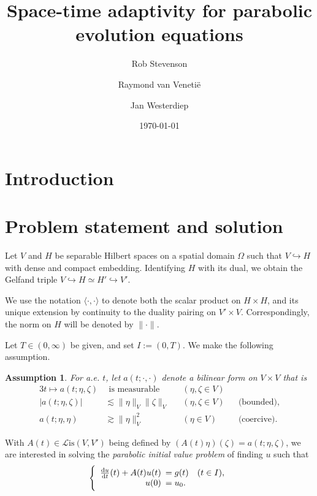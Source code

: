 \documentclass[11pt,a4paper,oneside,english]{amsart}
\title{Space-time adaptivity for parabolic evolution equations}
\author{Rob Stevenson \and Raymond van Veneti\"e \and Jan Westerdiep}
\date{\today}
\numberwithin{equation}{section}
\numberwithin{theorem}{section}
\newtheorem{assum}[theorem]{Assumption}
\theoremstyle{definition}
\newcommand{\la}{\langle}
\newcommand{\ra}{\rangle}
\newcommand{\cL}{\mathcal L}
\newcommand{\Lis}{\cL\mathrm{is}}
\begin{document}
\begin{abstract}
\end{abstract}

\maketitle

\section{Introduction}
\section{Problem statement and solution}
Let $V$ and $H$ be separable Hilbert spaces on a spatial domain $\Omega$ such that
$V \hookrightarrow H$ with dense and compact embedding. Identifying $H$ with its
dual, we obtain the Gelfand triple $V \hookrightarrow H \simeq H' \hookrightarrow V'$.

We use the notation $\la \cdot,\cdot \ra$ to denote both the scalar product
on $H \times H$, and its unique extension by continuity to the duality pairing on
$V' \times V$. Correspondingly, the norm on $H$ will be denoted by $\|\cdot\|$.

Let $T \in (0, \infty)$ be given, and set $I := (0, T)$. We make the following assumption.
\begin{assum}
  \label{assum:a}
  For a.e. $t$, let $a(t;\cdot,\cdot)$ denote a bilinear form on $V \times V$ that is
  \begin{alignat*}{3}
    t \mapsto a(t; \eta, \zeta) & ~~ \text{is measurable} \quad && (\eta, \zeta \in V) \\
    |a(t;\eta,\zeta)| & \lesssim  \|\eta\|_{V} \|\zeta\|_{V} &&(\eta,\zeta \in V) &&\text{(bounded)}, \\
     a(t;\eta,\eta)   & \gtrsim   \|\eta\|_{V}^2 &&(\eta \in {V}) &&\text{(coercive)}.
  \end{alignat*}
\end{assum}

With $A(t) \in \Lis({V},V')$ being defined by $ (A(t) \eta)(\zeta)=a(t;\eta,\zeta)$,
we are interested in solving the {\em parabolic initial value problem} of finding
$u$ such that
\begin{equation}
  \label{eqn:ibvp}
  \left\{
    \begin{array}{rl} 
      \frac{\dif u}{\dif t}(t) +A(t) u(t)&\!\!\!= g(t) \quad(t \in I),\\
      u(0) &\!\!\!= u_0.
    \end{array}
  \right.
\end{equation}
\end{document}
